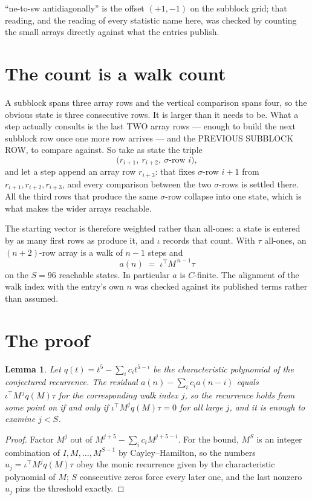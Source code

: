 \documentclass[11pt,a4paper]{article}
\theoremstyle{plain}
\newtheorem{lemma}[theorem]{Lemma}
\theoremstyle{definition}
\begin{document}
``ne-to-sw antidiagonally'' is the offset $(+1,-1)$ on the subblock grid; that reading, and
the reading of every statistic name here, was checked by counting the small arrays directly
against what the entries publish.

\section{The count is a walk count}

A subblock spans three array rows and the vertical comparison spans four, so the obvious state
is three consecutive rows. It is larger than it needs to be. What a step actually consults is
the last TWO array rows --- enough to build the next subblock row once one more row arrives ---
and the PREVIOUS SUBBLOCK ROW, to compare against. So take as state the triple
\[
\bigl(r_{i+1},\ r_{i+2},\ \sigma\text{-row }i\bigr),
\]
and let a step append an array row $r_{i+3}$: that fixes $\sigma$-row $i+1$ from
$r_{i+1},r_{i+2},r_{i+3}$, and every comparison between the two $\sigma$-rows is settled
there. All the third rows that produce the same $\sigma$-row collapse into one state, which is
what makes the wider arrays reachable.

The starting vector is therefore weighted rather than all-ones: a state is entered by as many
first rows as produce it, and $\iota$ records that count. With $\tau$ all-ones, an
$(n+2)$-row array is a walk of $n-1$ steps and
\[
a(n)\;=\;\iota^{\!\top}M^{\,n-1}\tau
\]
on the $S=96$ reachable states. In particular $a$ is $C$-finite. The alignment of the walk
index with the entry's own $n$ was checked against its published terms rather than assumed.

\section{The proof}

\begin{lemma}\label{lem:crit}
Let $q(t)=t^{5}-\sum_i c_it^{5-i}$ be the characteristic polynomial of the
conjectured recurrence. The residual $a(n)-\sum_ic_ia(n-i)$ equals
$\iota^{\!\top}M^{\,j}q(M)\tau$ for the corresponding walk index $j$, so the recurrence
holds from some point on if and only if $\iota^{\!\top}M^{j}q(M)\tau=0$ for all large $j$,
and it is enough to examine $j<S$.
\end{lemma}

\begin{proof}
Factor $M^{j}$ out of $M^{j+5}-\sum_ic_iM^{j+5-i}$. For the bound, $M^{S}$
is an integer combination of $I,M,\dots,M^{S-1}$ by Cayley--Hamilton, so the numbers
$u_j=\iota^{\!\top}M^{j}q(M)\tau$ obey the monic recurrence given by the characteristic
polynomial of $M$; $S$ consecutive zeros force every later one, and the last nonzero $u_j$
pins the threshold exactly.
\end{proof}
\end{document}
